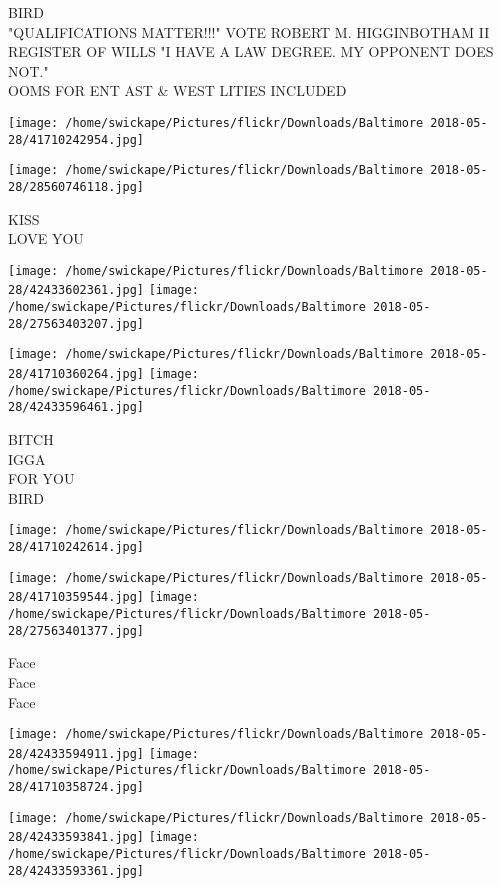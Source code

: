 \documentclass[10pt,letterpaper]{article}
\begin{document}
BIRD\\
"QUALIFICATIONS MATTER!!!" VOTE ROBERT M. HIGGINBOTHAM II REGISTER OF WILLS "I HAVE A LAW DEGREE.  MY OPPONENT DOES NOT."\\
OOMS FOR ENT AST \& WEST LITIES INCLUDED\\
\pagebreak

\texttt{[image: /home/swickape/Pictures/flickr/Downloads/Baltimore 2018-05-28/41710242954.jpg]}

\vspace{0.25in}
\texttt{[image: /home/swickape/Pictures/flickr/Downloads/Baltimore 2018-05-28/28560746118.jpg]}

KISS\\
LOVE YOU\\
\pagebreak

\texttt{[image: /home/swickape/Pictures/flickr/Downloads/Baltimore 2018-05-28/42433602361.jpg]}
\texttt{[image: /home/swickape/Pictures/flickr/Downloads/Baltimore 2018-05-28/27563403207.jpg]}

\texttt{[image: /home/swickape/Pictures/flickr/Downloads/Baltimore 2018-05-28/41710360264.jpg]}
\texttt{[image: /home/swickape/Pictures/flickr/Downloads/Baltimore 2018-05-28/42433596461.jpg]}

BITCH\\
IGGA\\
FOR YOU\\
BIRD\\
\pagebreak

\texttt{[image: /home/swickape/Pictures/flickr/Downloads/Baltimore 2018-05-28/41710242614.jpg]}

\vspace{0.25in}
\texttt{[image: /home/swickape/Pictures/flickr/Downloads/Baltimore 2018-05-28/41710359544.jpg]}
\texttt{[image: /home/swickape/Pictures/flickr/Downloads/Baltimore 2018-05-28/27563401377.jpg]}

Face\\
Face\\
Face\\
\pagebreak

\texttt{[image: /home/swickape/Pictures/flickr/Downloads/Baltimore 2018-05-28/42433594911.jpg]}
\texttt{[image: /home/swickape/Pictures/flickr/Downloads/Baltimore 2018-05-28/41710358724.jpg]}

\texttt{[image: /home/swickape/Pictures/flickr/Downloads/Baltimore 2018-05-28/42433593841.jpg]}
\texttt{[image: /home/swickape/Pictures/flickr/Downloads/Baltimore 2018-05-28/42433593361.jpg]}
\end{document}
